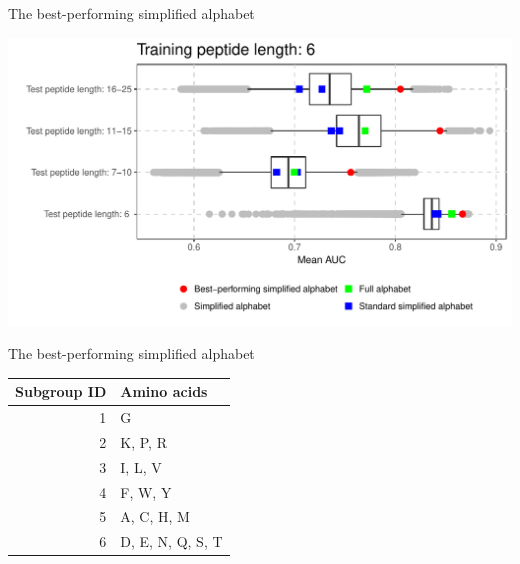 \documentclass{beamer}\usepackage[]{graphicx}\usepackage[]{color}
\makeatletter
\def\maxwidth{ %
  \ifdim\Gin@nat@width>\linewidth
    \linewidth
  \else
    \Gin@nat@width
  \fi
}
\newenvironment{knitrout}{}{} %
\makeatother
\begin{document}
    \begin{frame}{The best-performing simplified alphabet}
\begin{knitrout}
\color{fgcolor}

{\centering \includegraphics[width=\maxwidth]{figure/unnamed-chunk-15-1} 

}



\end{knitrout}
  \end{frame}

     \begin{frame}{The best-performing simplified alphabet}

   \begin{table}[ht]
\centering
\begin{tabular}{rl}
  \toprule
Subgroup ID & Amino acids \\ 
  \midrule
  1 & G \\ 
   \rowcolor[gray]{0.85}  2 & K, P, R \\ 
    3 & I, L, V \\ 
   \rowcolor[gray]{0.85}  4 & F, W, Y \\ 
    5 & A, C, H, M \\ 
   \rowcolor[gray]{0.85}  6 & D, E, N, Q, S, T \\ 
   \bottomrule
\end{tabular}
\end{table}
   
   \end{frame}
\end{document}

